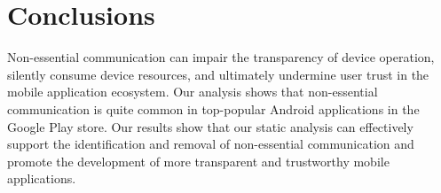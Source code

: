 \section{Conclusions}
\label{sec:conclusions}

Non-essential communication can impair the transparency of device
operation, silently consume device resources, and ultimately undermine
user trust in the mobile application ecosystem. Our analysis shows
that non-essential communication is quite common in 
top-popular Android applications in the Google Play store. 
Our results show that our static analysis can effectively 
support the identification and removal of
non-essential communication and promote the development of more
transparent and trustworthy mobile applications. 
